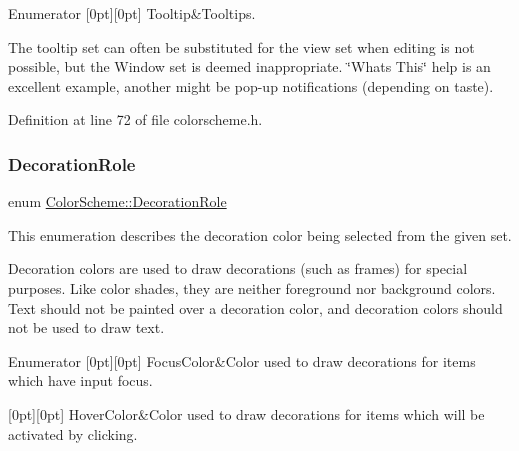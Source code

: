 \begin{DoxyEnumFields}{Enumerator}
[0pt][0pt]{}\mbox{\label{class_color_scheme_a56ea451e86dffa1822ed087902844e05a54266f367ee9fee32be3be727b114da8}} 
Tooltip&Tooltips.

The tooltip set can often be substituted for the view set when editing is not possible, but the Window set is deemed inappropriate. \char`\"{}\+What\textquotesingle{}s This\char`\"{} help is an excellent example, another might be pop-\/up notifications (depending on taste). \\
\hline

\end{DoxyEnumFields}


Definition at line 72 of file colorscheme.\+h.

\mbox{\label{class_color_scheme_a4ad022af301e30791c6c248e1fc656cf}} 
\subsubsection{\texorpdfstring{Decoration\+Role}{DecorationRole}}
{\footnotesize\ttfamily enum \hyperlink{class_color_scheme_a4ad022af301e30791c6c248e1fc656cf}{Color\+Scheme\+::\+Decoration\+Role}}

This enumeration describes the decoration color being selected from the given set.

Decoration colors are used to draw decorations (such as frames) for special purposes. Like color shades, they are neither foreground nor background colors. Text should not be painted over a decoration color, and decoration colors should not be used to draw text. \begin{DoxyEnumFields}{Enumerator}
[0pt][0pt]{}\mbox{\label{class_color_scheme_a4ad022af301e30791c6c248e1fc656cfae6c51f452dbc4241c20a7d00c18d0928}} 
Focus\+Color&Color used to draw decorations for items which have input focus. \\
\hline

[0pt][0pt]{}\mbox{\label{class_color_scheme_a4ad022af301e30791c6c248e1fc656cfadf0a5050e95756a18f4405f2d52f7d73}} 
Hover\+Color&Color used to draw decorations for items which will be activated by clicking. \\
\hline

\end{DoxyEnumFields}


